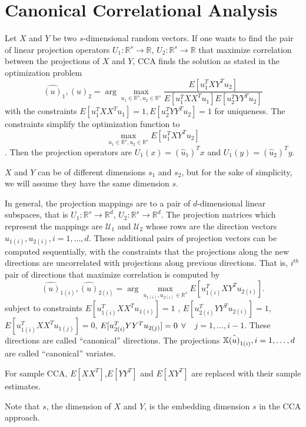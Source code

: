 \documentclass[12pt,oneside,final]{thesis}\usepackage[]{graphicx}\usepackage[]{color}
\begin{document}
\section{Canonical Correlational Analysis}

 Let $X$ and $Y$ be two $s$-dimensional random vectors. If  one wants to find  the pair of linear projection operators $U_1:\mathbb{R}^s \rightarrow  \mathbb{R}$, $U_2 :\mathbb{R}^s \rightarrow  \mathbb{R}$ that maximize correlation between the projections of   $X$ and $Y$, CCA finds the solution as stated in the  optimization problem
$$
{\hat{(u)}_1 ,\hat{(u)}_2}=\arg\max_{u_1\in\mathbb{R}^s,u_2\in\mathbb{R}^s} {\frac{E[u_1^{T}XY^Tu_2]}{{E[u_1^{T}XX^T u_1]}{E[u_2^{T}YY^T u_2]}}}$$
with the constraints $E[{u_1^{T}XX^T u_1}]=1 , E[{u_2^{T}YY^T u_2}]=1$ for uniqueness. The constraints simplify the optimization function to $$
\max_{u_1\in \mathbb{R}^s,u_2\in \mathbb{R}^s} {E[u_1^{T}XY^Tu_2]}$$. Then the projection operators are $U_1(x)=(\hat{u}_1)^{T} x$ and $U_1(y)=(\hat{u}_2)^{T} y$.
\begin{remark}
$X$ and $Y$ can be of different dimensions $s_1$ and $s_2$, but for  the sake of simplicity, we will assume they have the same dimension $s$. 
\end{remark}
In general, the projection mappings are to a pair of $d$-dimensional linear subspaces, that is $U_1:\mathbb{R}^s \rightarrow  \mathbb{R}^{d}$, $U_2 :\mathbb{R}^s \rightarrow  \mathbb{R}^{d}$. The projection matrices which represent the mappings are $\mathcal{U}_1$ and $\mathcal{U}_2$  whose rows are the direction vectors ${{u}_{1(i)},{u}_{2(i)}}, i=1,\ldots,d $. These additional pairs of projection vectors can be computed sequentially, with the constraints that the projections along the new directions are uncorrelated with  projections along previous directions. That is, $i^{th}$ pair of directions  that maximize correlation is computed by 
$$
{\hat{(u)}_{1(i)},\hat{(u)}_{2(i)}}=\arg\max_{u_{1(i)},u_{2(i)}\in\mathbb{R}^s} {E[u_{1(i)}^{T}XY^Tu_{2(i)}]}.$$ subject to constraints $E[{u_{1(i)}^{T}XX^T u_{1(i)}}]=1$ , $E[{u_{2(i)}^{T}YY^T u_{2(i)}}]=1$, $E[{u_{1(i)}^{T}XX^T u_{1(j)}}]=0$,  
   $ E[{u_{2(i)}^{T}YY^T u_{2(j)}}]=\nolinebreak0$ $\forall \quad  j=1,\ldots,i-1$.  These directions are called ``canonical'' directions. The projections $\mathbb{X} \hat{(u)}_{1(i)}, i=1,\ldots,d$ are called ``canonical'' variates.
   
   For sample CCA, $E[XX^T]$,$E[YY^T]$ and $E[XY^T]$ are replaced with their sample estimates.


Note that $s$, the dimension of $X$ and $Y$, is the embedding dimension $s$  in the CCA approach. 
\end{document}
